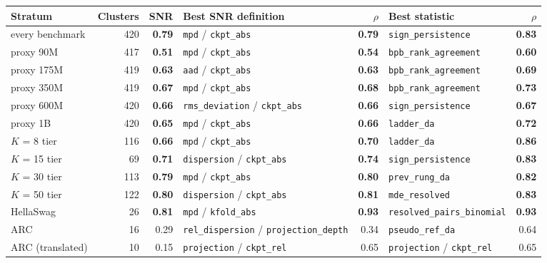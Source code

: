 \begin{table}[t]
\centering
\scriptsize
\begin{tabular}{@{}lrrlrlr@{}}
\toprule
\textbf{Stratum} & \textbf{Clusters} & \textbf{SNR} & \textbf{Best SNR definition} & $\rho$ & \textbf{Best statistic} & $\rho$ \\
\midrule
every benchmark & 420 & \textbf{0.79} & \texttt{mpd} / \texttt{ckpt\_abs} & \textbf{0.79} & \texttt{sign\_persistence} & \textbf{0.83} \\
\midrule
proxy 90M & 417 & \textbf{0.51} & \texttt{mpd} / \texttt{ckpt\_abs} & \textbf{0.54} & \texttt{bpb\_rank\_agreement} & \textbf{0.60} \\
proxy 175M & 419 & \textbf{0.63} & \texttt{aad} / \texttt{ckpt\_abs} & \textbf{0.63} & \texttt{bpb\_rank\_agreement} & \textbf{0.69} \\
proxy 350M & 419 & \textbf{0.67} & \texttt{mpd} / \texttt{ckpt\_abs} & \textbf{0.68} & \texttt{bpb\_rank\_agreement} & \textbf{0.73} \\
proxy 600M & 420 & \textbf{0.66} & \texttt{rms\_deviation} / \texttt{ckpt\_abs} & \textbf{0.66} & \texttt{sign\_persistence} & \textbf{0.67} \\
proxy 1B & 420 & \textbf{0.65} & \texttt{mpd} / \texttt{ckpt\_abs} & \textbf{0.66} & \texttt{ladder\_da} & \textbf{0.72} \\
\midrule
$K$ = 8 tier & 116 & \textbf{0.66} & \texttt{mpd} / \texttt{ckpt\_abs} & \textbf{0.70} & \texttt{ladder\_da} & \textbf{0.86} \\
$K$ = 15 tier & 69 & \textbf{0.71} & \texttt{dispersion} / \texttt{ckpt\_abs} & \textbf{0.74} & \texttt{sign\_persistence} & \textbf{0.83} \\
$K$ = 30 tier & 113 & \textbf{0.79} & \texttt{mpd} / \texttt{ckpt\_abs} & \textbf{0.80} & \texttt{prev\_rung\_da} & \textbf{0.82} \\
$K$ = 50 tier & 122 & \textbf{0.80} & \texttt{dispersion} / \texttt{ckpt\_abs} & \textbf{0.81} & \texttt{mde\_resolved} & \textbf{0.83} \\
\midrule
HellaSwag & 26 & \textbf{0.81} & \texttt{mpd} / \texttt{kfold\_abs} & \textbf{0.93} & \texttt{resolved\_pairs\_binomial} & \textbf{0.93} \\
ARC & 16 & 0.29 & \texttt{rel\_dispersion} / \texttt{projection\_depth} & 0.34 & \texttt{pseudo\_ref\_da} & 0.64 \\
ARC (translated) & 10 & 0.15 & \texttt{projection} / \texttt{ckpt\_rel} & 0.65 & \texttt{projection} / \texttt{ckpt\_rel} & 0.65 \\

\end{tabular}
\end{table}
